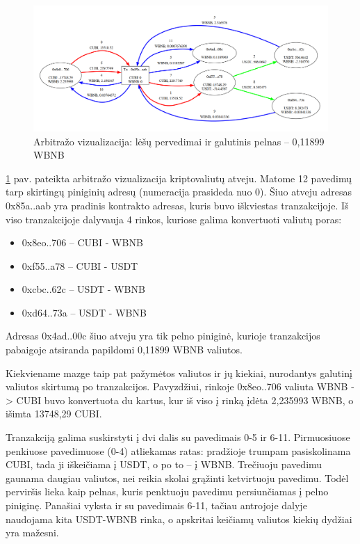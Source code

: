 \documentclass[]{VUMIFTemplateClass}
\begin{document}
\begin{figure}[H]
    \centering
    \includegraphics[scale=0.3]{img/arb1.png}
    \caption{Arbitražo vizualizacija: lėšų pervedimai ir galutinis pelnas – 0,11899 WBNB}
    \label{img:chess-minimax-2}
\end{figure} 

\ref{img:chess-minimax-2} pav. pateikta arbitražo vizualizacija kriptovaliutų atveju. Matome 12 pavedimų tarp skirtingų piniginių adresų (numeracija prasideda nuo 0). Šiuo atveju adresas 0x85a..aab yra pradinis kontrakto adresas, kuris buvo iškviestas tranzakcijoje. Iš viso tranzakcijoje dalyvauja 4 rinkos, kuriose galima konvertuoti valiutų poras:

\begin{itemize}
    \item 0x8eo..706 -- CUBI - WBNB
    \item 0xf55..a78 -- CUBI - USDT
    \item 0xcbc..62c -- USDT - WBNB
    \item 0xd64..73a -- USDT - WBNB
\end{itemize}

Adresas 0x4ad..00c šiuo atveju yra tik pelno piniginė, kurioje tranzakcijos pabaigoje atsiranda papildomi 0,11899 WBNB valiutos.

Kiekviename mazge taip pat pažymėtos valiutos ir jų kiekiai, nurodantys galutinį valiutos skirtumą po tranzakcijos. Pavyzdžiui, rinkoje 0x8eo..706 valiuta WBNB -> CUBI buvo konvertuota du kartus, kur iš viso į rinką įdėta 2,235993 WBNB, o išimta 13748,29 CUBI.

Tranzakciją galima suskirstyti į dvi dalis su pavedimais 0-5 ir 6-11. Pirmuosiuose penkiuose pavedimuose (0-4) atliekamas ratas: pradžioje trumpam pasiskolinama CUBI, tada ji iškeičiama į USDT, o po to -- į WBNB. Trečiuoju pavedimu gaunama daugiau valiutos, nei reikia skolai grąžinti ketvirtuoju pavedimu. Todėl perviršis lieka kaip pelnas, kuris penktuoju pavedimu persiunčiamas į pelno piniginę. Panašiai vyksta ir su pavedimais 6-11, tačiau antrojoje dalyje naudojama kita USDT-WBNB rinka, o apskritai keičiamų valiutos kiekių dydžiai yra mažesni.
\end{document}
